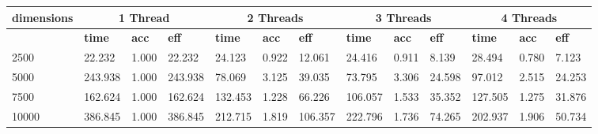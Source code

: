 \documentclass{article}
\begin{document}
\begin{table}[]\begin{tabular}{|l|l|l|l|l|l|l|l|l|l|l|l|l|}\hline
\multicolumn{1}{|c|}{\textbf{dimensions}} & \multicolumn{3}{c|}{\textbf{1 Thread}} & \multicolumn{3}{c|}{\textbf{2 Threads}} & \multicolumn{3}{c|}{\textbf{3 Threads}} & \multicolumn{3}{c|}{\textbf{4 Threads}} \\ \hline
 & \textbf{time} & \textbf{acc} & \textbf{eff} & \textbf{time} & \textbf{acc} & \textbf{eff} & \textbf{time} & \textbf{acc} & \textbf{eff} & \textbf{time} & \textbf{acc} & \textbf{eff}\\ \hline
2500
 & 22.232 & 1.000 & 22.232 & 24.123 & 0.922 & 12.061 & 24.416 & 0.911 & 8.139 & 28.494 & 0.780 & 7.123\\ \hline
5000
 & 243.938 & 1.000 & 243.938 & 78.069 & 3.125 & 39.035 & 73.795 & 3.306 & 24.598 & 97.012 & 2.515 & 24.253\\ \hline
7500
 & 162.624 & 1.000 & 162.624 & 132.453 & 1.228 & 66.226 & 106.057 & 1.533 & 35.352 & 127.505 & 1.275 & 31.876\\ \hline
10000
 & 386.845 & 1.000 & 386.845 & 212.715 & 1.819 & 106.357 & 222.796 & 1.736 & 74.265 & 202.937 & 1.906 & 50.734\\ \hline
\end{tabular}
\end{table}
\end{document}
